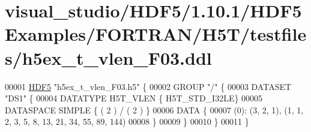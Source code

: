 \hypertarget{visual__studio_2_h_d_f5_21_810_81_2_h_d_f5_examples_2_f_o_r_t_r_a_n_2_h5_t_2testfiles_2h5ex__t__vlen___f03_8ddl_source}{}\section{visual\+\_\+studio/\+H\+D\+F5/1.10.1/\+H\+D\+F5\+Examples/\+F\+O\+R\+T\+R\+A\+N/\+H5\+T/testfiles/h5ex\+\_\+t\+\_\+vlen\+\_\+\+F03.ddl}
\label{visual__studio_2_h_d_f5_21_810_81_2_h_d_f5_examples_2_f_o_r_t_r_a_n_2_h5_t_2testfiles_2h5ex__t__vlen___f03_8ddl_source}

\begin{DoxyCode}
00001 \hyperlink{namespace_h_d_f5}{HDF5} \textcolor{stringliteral}{"h5ex\_t\_vlen\_F03.h5"} \{
00002 GROUP \textcolor{stringliteral}{"/"} \{
00003    DATASET \textcolor{stringliteral}{"DS1"} \{
00004       DATATYPE  H5T\_VLEN \{ H5T\_STD\_I32LE\}
00005       DATASPACE  SIMPLE \{ ( 2 ) / ( 2 ) \}
00006       DATA \{
00007       (0): (3, 2, 1), (1, 1, 2, 3, 5, 8, 13, 21, 34, 55, 89, 144)
00008       \}
00009    \}
00010 \}
00011 \}
\end{DoxyCode}
